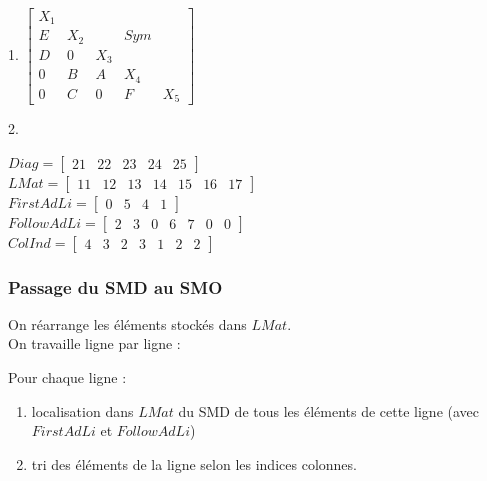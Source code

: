 \documentclass[12pt,a4paper]{article}
\begin{document}
	\begin{ex}$ $\\
		\begin{minipage}[t]{7cm}
			1. $\begin{bmatrix}
			X_1 \\
			E & X_2 & &  Sym \\
			D & 0 & X_3 \\
			0 & B & A & X_4 \\
			0 & C & 0 & F & X_5
		\end{bmatrix}$
		\end{minipage}\begin{minipage}[t]{7cm}
		2. \begin{minipage}{7cm}
			$Diag = \begin{bmatrix}
			21 & 22 & 23 &24 &25
		\end{bmatrix}$\\
		$LMat = \begin{bmatrix}
			11 & 12 & 13 & 14 & 15 & 16 & 17
		\end{bmatrix}$\\
		$FirstAdLi = \begin{bmatrix}
			0 & 5 & 4 & 1
		\end{bmatrix}$\\
		$FollowAdLi = \begin{bmatrix}
			2 & 3 & 0 & 6 & 7 & 0 & 0
		\end{bmatrix}$\\
		$ColInd = \begin{bmatrix}
			4 & 3 & 2 & 3 & 1 & 2 & 2
		\end{bmatrix}$
		\end{minipage}
		\end{minipage}
	\end{ex}
	
	\subsubsection{Passage du SMD au SMO}
	
	On réarrange les éléments stockés dans $LMat$.\\
	On travaille ligne par ligne :\\
	\hspace*{1cm} \begin{minipage}[t]{15cm}
		Pour chaque ligne :
		\begin{enumerate}[label=-]
			\item localisation dans $LMat$ du SMD de tous les éléments de cette ligne (avec $FirstAdLi$ et $FollowAdLi$)
			
			\item tri des éléments de la ligne selon les indices colonnes.
		\end{enumerate}
	\end{minipage}
	
\end{document}
